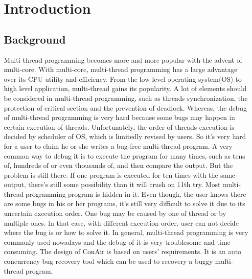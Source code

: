 \section{Introduction}

\subsection{Background}
Multi-thread programming becomes more and more popular with the advent of
multi-core. With multi-core, multi-thread programming has a large advantage over
its CPU utility and efficiency. From the low level operating system(OS) to high
level application, multi-thread gains its popularity. A lot of elements should
be considered in multi-thread programming, such as threads synchronization, the
protection of critical section and the prevention of deadlock. Whereas, the
debug of multi-thread programming is very hard because some bugs may happen in
certain execution of threads. Unfortunately, the order of threads execution is
decided by scheduler of OS, which is limitedly revised by users. So it's very
hard for a user to claim he or she writes a bug-free multi-thread program. A
very common way to debug it is to execute the program for many times, such as
tens of, hundreds of or even thousands of, and then compare the output. But the
problem is still there. If one program is executed for ten times with the same
output, there's still some possibility than it will crush on 11th try. Most
multi-thread programming program is hidden in it. Even though, the user knows
there are some bugs in his or her programs, it's still very difficult to solve
it due to its uncertain execution order. One bug may be caused by one of thread
or by multiple ones. In that case, with different execution order, user can not
decide where the bug is or how to solve it.  In general, multi-thread
programming is very commonly used nowadays and the debug of it is very
troublesome and time-consuming. The design of ConAir is based on users'
requirements. It is an auto concurrency bug recovery tool which can be used to
recovery a buggy multi-thread program.


